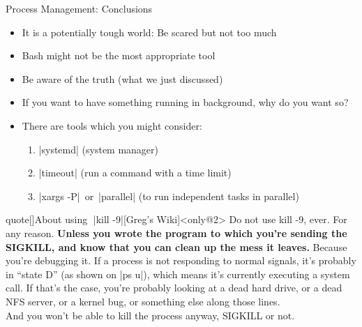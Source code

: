 \begin{frame}{Process Management: Conclusions}
    \vspace{-2mm}
    \begin{overlayarea}{\textwidth}{0.7\textheight}
        \begin{itemize}[<only@1-2>]
            \setlength{\itemsep}{0mm}
            \item It is a potentially tough world: Be scared but not too much
            \item Bash might not be the most appropriate tool
            \item Be aware of the truth (what we just discussed)
            \item If you want to have something running in background, why do you want so?
            \item There are tools which you might consider:\\[0.3ex]
            \begin{enumerate}
                \item \bash|systemd| (system manager)
                \item \bash|timeout| (run a command with a time limit)
                \item \bash|xargs -P| \,or\, \bash|parallel| (to run independent tasks in parallel)
            \end{enumerate}
        \end{itemize}
        \begin{varblock}{quote}[\textwidth]{About using $\;$\bash|kill -9|}[Greg's Wiki]<only@2>
            Do not use kill -9, ever.
            For any reason.
            \textbf{Unless you wrote the program to which you're sending the SIGKILL, and know that you can clean up the mess it leaves.}
            Because you're debugging it.
            If a process is not responding to normal signals, it's probably in ``state D'' (as shown on \textnormal{\bash|ps u|}), which means it's currently executing a system call.
            If that's the case, you're probably looking at a dead hard drive, or a dead NFS server, or a kernel bug, or something else along those lines.\\
            And you won't be able to kill the process anyway, SIGKILL or not.
        \end{varblock}
    \end{overlayarea}
\end{frame}






